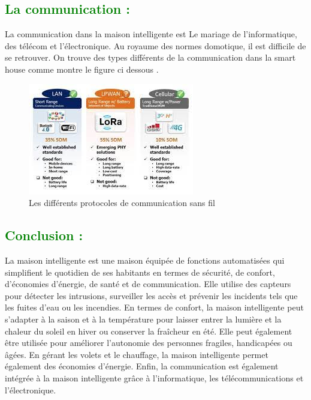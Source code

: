 \begin{flushleft}
 	\subsection{\textcolor{green}{La communication :}}
 	La communication dans la maison intelligente est Le
 	mariage de l'informatique, des télécom et l'électronique. Au royaume
 	des normes domotique, il est difficile de se retrouver. On trouve des
 	types différents de la communication dans la smart house comme montre le figure ci dessous .
 	\begin{figure}[h]
 		\centering
 		\includegraphics{chapitres/images/communication.jpg}
 		\caption{Les différents protocoles de communication sans fil}
 		\label{fig:labelname}
 	\end{figure}
 	\subsection{\textcolor{green}{Conclusion :}}
 	La maison intelligente est une maison équipée de fonctions automatisées qui simplifient le quotidien de ses habitants en termes de sécurité, de confort, d'économies d'énergie, de santé et de communication. Elle utilise des capteurs pour détecter les intrusions, surveiller les accès et prévenir les incidents tels que les fuites d'eau ou les incendies. En termes de confort, la maison intelligente peut s'adapter à la saison et à la température pour laisser entrer la lumière et la chaleur du soleil en hiver ou conserver la fraîcheur en été. Elle peut également être utilisée pour améliorer l'autonomie des personnes fragiles, handicapées ou âgées. En gérant les volets et le chauffage, la maison intelligente permet également des économies d'énergie. Enfin, la communication est également intégrée à la maison intelligente grâce à l'informatique, les télécommunications et l'électronique.
 	
 	\newpage
\end{flushleft}
